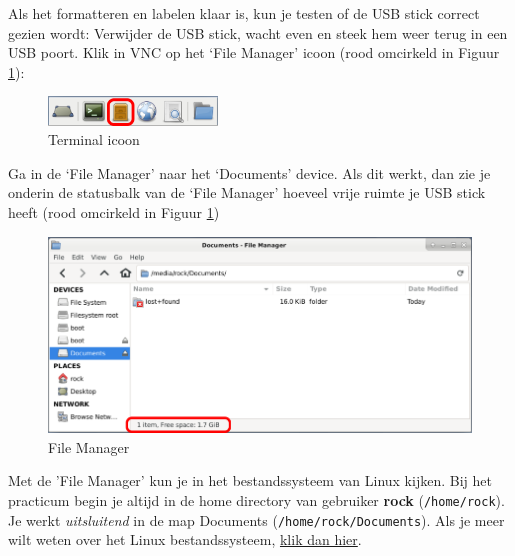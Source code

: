 Als het formatteren en labelen klaar is, kun je testen of de USB stick correct gezien wordt:\newline
Verwijder de USB stick, wacht even en steek hem weer terug in een USB poort.\newline
Klik in VNC op het ‘File Manager’ icoon (rood omcirkeld in Figuur \ref{fig:fileman}):

\begin{figure}[h!]
	\centering
	\begin{center} 	
		\includegraphics[width=0.4\textwidth]{figuren/File-Manager}
		\caption{Terminal icoon}
		\label{fig:fileman}   
	\end{center}
\end{figure}
Ga in de ‘File Manager’ naar het ‘Documents’ device.\newline
Als dit werkt, dan zie je onderin de statusbalk van de ‘File Manager’ hoeveel vrije ruimte je USB stick heeft (rood omcirkeld in Figuur \ref{fig:fileman})

\begin{figure}[h!]
	\centering
	\begin{center} 	
		\includegraphics[width=1\textwidth]{figuren/FileManagerUsbStick}
		\caption{File Manager}
		\label{fig:FileManagerUsbStick}   
	\end{center}
\end{figure}

Met de 'File Manager' kun je in het bestandssysteem van Linux kijken.\newline
Bij het practicum begin je altijd in de home directory van gebruiker \textbf{rock} (\texttt{/home/rock}). Je werkt \textit{uitsluitend} in de map Documents (\texttt{/home/rock/Documents}).\newline
Als je meer wilt weten over het Linux bestandssysteem, \href{https://www.techrepublic.com/article/linux-101-demystifying-the-linux-directory-structure/}{klik dan hier}.
